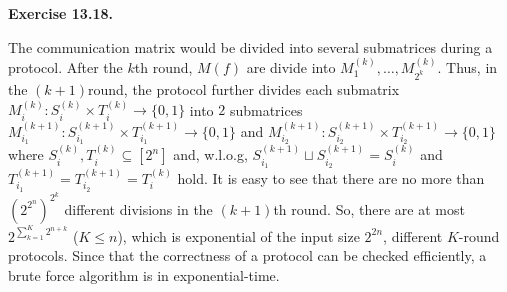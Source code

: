 \documentclass[a4paper]{article}
\newenvironment{exercise}[1]{
	\par
	\noindent\textbf{Exercise #1.}\quad
}{
	\par
	\bigskip
}
\begin{document}
    \begin{exercise}{13.18}
    	The communication matrix would be divided into several submatrices during a protocol. After the $k$th round, $M(f)$ are divide into $M^{(k)}_1, \ldots, M^{(k)}_{2^k}$. Thus, in the $(k + 1)$round, the protocol further divides each submatrix $M_i^{(k)}: S_i^{(k)}\times T_i^{(k)} \to \{0, 1\}$ into $2$ submatrices $M_{i_1}^{(k + 1)}: S_{i_1}^{(k + 1)}\times T_{i_1}^{(k + 1)} \to \{0, 1\}$ and $M_{i_2}^{(k + 1)}: S_{i_2}^{(k + 1)}\times T_{i_2}^{(k + 1)} \to \{0, 1\}$ where $S_i^{(k)}, T_i^{(k)} \subseteq [2^n]$ and, w.l.o.g, $S_{i_1}^{(k + 1)} \sqcup S_{i_2}^{(k + 1)} = S_i^{(k)}$ and $T_{i_1}^{(k + 1)} = T_{i_2}^{(k + 1)} = T_i^{(k)}$ hold. It is easy to see that there are no more than $(2^{2^n})^{2^k}$ different divisions in the $(k+1)$th round. So, there are at most $2^{\sum_{k = 1}^K2^{n+k}}$ ($K \leq n$), which is exponential of the input size $2^{2n}$, different $K$-round protocols. Since that the correctness of a protocol can be checked efficiently, a brute force algorithm is in exponential-time.
    \end{exercise}
\end{document}
